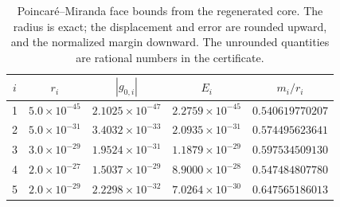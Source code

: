 \begin{table}[ht]
\centering
\begin{tabular}{@{}ccccc@{}}
\toprule
$i$ & $r_i$ & $|g_{0,i}|$ & $E_i$ & $m_i/r_i$ \\
\midrule
1 & $5.0\times10^{-45}$ & $2.1025\times10^{-47}$ & $2.2759\times10^{-45}$ & $0.540619770207$ \\
2 & $5.0\times10^{-31}$ & $3.4032\times10^{-33}$ & $2.0935\times10^{-31}$ & $0.574495623641$ \\
3 & $3.0\times10^{-29}$ & $1.9524\times10^{-31}$ & $1.1879\times10^{-29}$ & $0.597534509130$ \\
4 & $2.0\times10^{-27}$ & $1.5037\times10^{-29}$ & $8.9000\times10^{-28}$ & $0.547484807780$ \\
5 & $2.0\times10^{-29}$ & $2.2298\times10^{-32}$ & $7.0264\times10^{-30}$ & $0.647565186013$ \\
\bottomrule
\end{tabular}
\caption{Poincar\'e--Miranda face bounds from the regenerated core. The radius is exact;
the displacement and error are rounded upward, and the normalized margin downward.
The unrounded quantities are rational numbers in the certificate.}
\label{tab:poincare-full}
\end{table}
